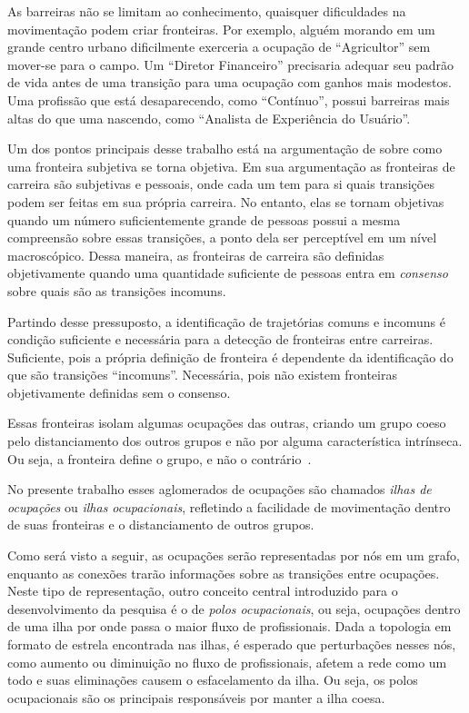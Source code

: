 \documentclass[12pt,a4paper]{article}
\begin{document}
As barreiras não se limitam ao conhecimento, quaisquer dificuldades na movimentação podem criar fronteiras. Por exemplo, alguém morando em um grande centro urbano dificilmente exerceria a ocupação de \enquote{Agricultor} sem mover-se para o campo. Um \enquote{Diretor Financeiro} precisaria adequar seu padrão de vida antes de uma transição para uma ocupação com ganhos mais modestos. Uma profissão que está desaparecendo, como \enquote{Contínuo}, possui barreiras mais altas do que uma nascendo, como \enquote{Analista de Experiência do Usuário}.

Um dos pontos principais desse trabalho está na argumentação de  sobre como uma fronteira subjetiva se torna objetiva. Em sua argumentação as fronteiras de carreira são subjetivas e pessoais, onde cada um tem para si quais transições podem ser feitas em sua própria carreira. No entanto, elas se tornam objetivas quando um número suficientemente grande de pessoas possui a mesma compreensão sobre essas transições, a ponto dela ser perceptível em um nível macroscópico. Dessa maneira, as fronteiras de carreira são definidas objetivamente quando uma quantidade suficiente de pessoas entra em \textit{consenso} sobre quais são as transições incomuns.

Partindo desse pressuposto, a identificação de trajetórias comuns e incomuns é condição suficiente e necessária para a detecção de fronteiras entre carreiras. Suficiente, pois a própria definição de fronteira é dependente da identificação do que são transições \enquote{incomuns}. Necessária, pois não existem fronteiras objetivamente definidas sem o consenso.

Essas fronteiras isolam algumas ocupações das outras, criando um grupo coeso pelo distanciamento dos outros grupos e não por alguma característica intrínseca.  Ou seja, a fronteira define o grupo, e não o contrário~\cite{Gunz2007-hr,Abbott1995-ft}. 

No presente trabalho esses aglomerados de ocupações são chamados \textit{ilhas de ocupações} ou \textit{ilhas ocupacionais}, refletindo a facilidade de movimentação dentro de suas fronteiras e o distanciamento de outros grupos.

Como será visto a seguir, as ocupações serão representadas por nós em um grafo, enquanto as conexões trarão informações sobre as transições entre ocupações. Neste tipo de representação, outro conceito central introduzido para o desenvolvimento da pesquisa é o de \textit{polos ocupacionais}, ou seja, ocupações dentro de uma ilha por onde passa o maior fluxo de profissionais. Dada a topologia em formato de estrela encontrada nas ilhas, é esperado que perturbações nesses nós, como aumento ou diminuição no fluxo de profissionais, afetem a rede como um todo e suas eliminações causem o esfacelamento da ilha. Ou seja, os polos ocupacionais são os principais responsáveis por manter a ilha coesa.
\end{document}
